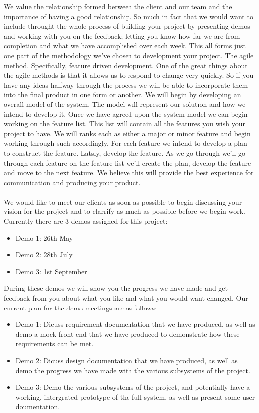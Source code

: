 We value the relationship formed between the client and our team and the importance of having a good relationship. So much in fact that we would want to include throught the whole process of building your project by presenting demos and working with you on the feedback; letting you know how far we are from completion and what we have accomplished over each week. This all forms just one part of the methodology we've chosen to development your project. The agile method. Specifically, feature driven development. One of the great things about the agile methods is that it allows us to respond to change very quickly. So if you have any ideas halfway through the process we will be able to incorporate them into the final product in one form or another. We will begin by developing an overall model of the system. The model will represent our solution and how we intend to develop it. Once we have agreed upon the system model we can begin working on the feature list. This list will contain all the features you wish your project to have. We will ranks each as either a major or minor feature and begin working through such accordingly. For each feature we intend to develop a plan to construct the feature. Latsly, develop the feature. As we go through we'll go through each feature on the feature list we'll create the plan, develop the feature and move to the next feature. We believe this will provide the best experience for communication and producing your product.\\
\\
We would like to meet our clients as soon as possible to begin discussing your vision for the project and to clarrify as much as possible
before we begin work. Currently there are 3 demos assigned for this project:
	\begin{itemize}
        \item Demo 1: 26th May
        \item Demo 2: 28th July
        \item Demo 3: 1st September
    \end{itemize}
During these demos we will show you the progress we have made and get feedback from you about what you like and what you would want changed.
Our current plan for the demo meetings are as follows:
	\begin{itemize}
        \item Demo 1: Dicuss requirement documentation that we have produced, as well as demo a mock front-end that we have produced to 
        demonstrate how these requirements can be met. 
        \item Demo 2: Dicuss design documentation that we have produced, as well as demo the progress we have made with the various subsystems 
        of the project.
        \item Demo 3: Demo the various subsystems of the project, and potentially have a working, intergrated prototype of the full system, as 
        well as present some user doumentation.
    \end{itemize}
